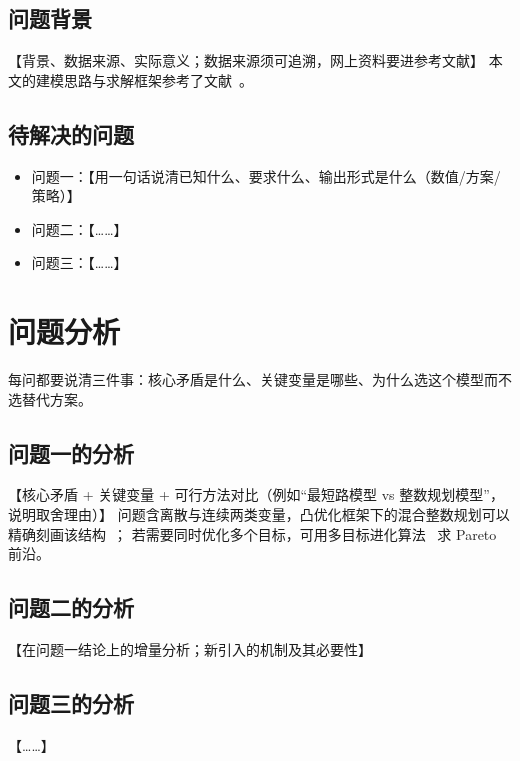 \documentclass[12pt,a4paper,fontset=windows]{ctexart}
\begin{document}
\subsection{问题背景}
【背景、数据来源、实际意义；数据来源须可追溯，网上资料要进参考文献】
本文的建模思路与求解框架参考了文献~\cite{jiang2018model,si2021algorithm}。

\subsection{待解决的问题}
\begin{itemize}
  \item 问题一：【用一句话说清已知什么、要求什么、输出形式是什么（数值/方案/策略）】
  \item 问题二：【……】
  \item 问题三：【……】
\end{itemize}

\section{问题分析}
每问都要说清三件事：核心矛盾是什么、关键变量是哪些、为什么选这个模型而不选替代方案。

\subsection{问题一的分析}
【核心矛盾 + 关键变量 + 可行方法对比（例如“最短路模型 vs 整数规划模型”，说明取舍理由）】
问题含离散与连续两类变量，凸优化框架下的混合整数规划可以精确刻画该结构~\cite{boyd2004convex}；
若需要同时优化多个目标，可用多目标进化算法~\cite{deb2002nsga2} 求 Pareto 前沿。

\subsection{问题二的分析}
【在问题一结论上的增量分析；新引入的机制及其必要性】

\subsection{问题三的分析}
【……】
\end{document}
